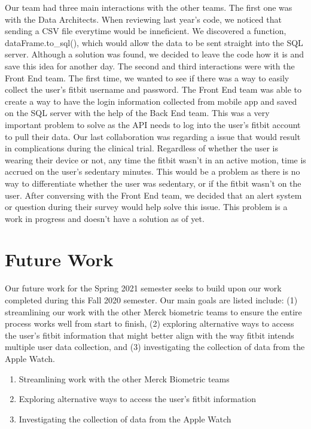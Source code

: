 \documentclass[]{book}
\providecommand{\tightlist}{%
  \setlength{\itemsep}{0pt}\setlength{\parskip}{0pt}}
\begin{document}
Our team had three main interactions with the other teams. The first one was with the Data Architects. When reviewing last year's code, we noticed that sending a CSV file everytime would be inneficient. We discovered a function, dataFrame.to\_sql(), which would allow the data to be sent straight into the SQL server. Although a solution was found, we decided to leave the code how it is and save this idea for another day. The second and third interactions were with the Front End team. The first time, we wanted to see if there was a way to easily collect the user's fitbit username and password. The Front End team was able to create a way to have the login information collected from mobile app and saved on the SQL server with the help of the Back End team. This was a very important problem to solve as the API needs to log into the user's fitbit account to pull their data. Our last collaboration was regarding a issue that would result in complications during the clinical trial. Regardless of whether the user is wearing their device or not, any time the fitbit wasn't in an active motion, time is accrued on the user's sedentary minutes. This would be a problem as there is no way to differentiate whether the user was sedentary, or if the fitbit wasn't on the user. After conversing with the Front End team, we decided that an alert system or question during their survey would help solve this issue. This problem is a work in progress and doesn't have a solution as of yet.

\hypertarget{future-work}{%
\section{Future Work}\label{future-work}}

Our future work for the Spring 2021 semester seeks to build upon our work completed during this Fall 2020 semester. Our main goals are listed include: (1) streamlining our work with the other Merck biometric teams to ensure the entire process works well from start to finish, (2) exploring alternative ways to access the user's fitbit information that might better align with the way fitbit intends multiple user data collection, and (3) investigating the collection of data from the Apple Watch.

\begin{enumerate}
\def\labelenumi{(\arabic{enumi})}
\tightlist
\item
  Streamlining work with the other Merck Biometric teams
\item
  Exploring alternative ways to access the user's fitbit information
\item
  Investigating the collection of data from the Apple Watch
\end{enumerate}
\end{document}
